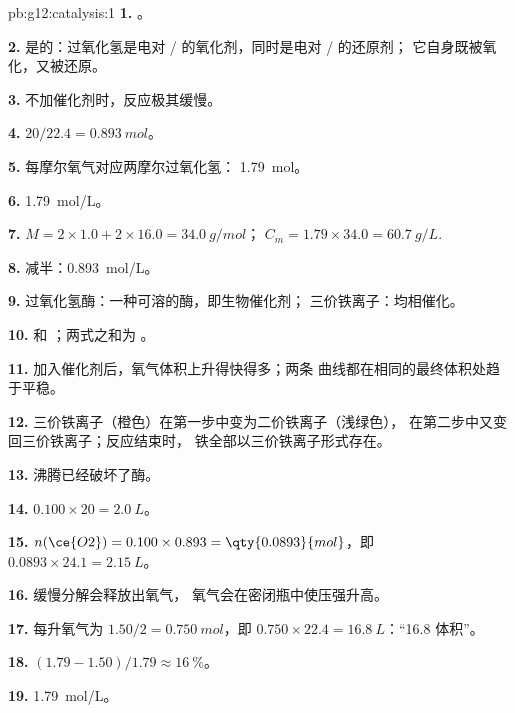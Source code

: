 \begin{solution}{pb:g12:catalysis:1}
\textbf{1.} 。

\textbf{2.} 是的：过氧化氢是电对
/ 的氧化剂，同时是电对 / 的还原剂；
它自身既被氧化，又被还原。

\textbf{3.} 不加催化剂时，反应极其缓慢。

\textbf{4.} $20 / 22.4 = \qty{0.893}{mol}$。

\textbf{5.} 每摩尔氧气对应两摩尔过氧化氢：
\qty{1.79}{mol}。

\textbf{6.} \qty{1.79}{mol/L}。

\textbf{7.} $M = 2 \times 1.0 + 2 \times 16.0 = \qty{34.0}{g/mol}$；
$C_m = 1.79 \times 34.0 = \qty{60.7}{g/L}$.

\textbf{8.} 减半：\qty{0.893}{mol/L}。

\textbf{9.} 过氧化氢酶：一种可溶的酶，即生物催化剂；
三价铁离子：均相催化。

\textbf{10.}  和
；两式之和为
。

\textbf{11.} 加入催化剂后，氧气体积上升得快得多；两条
曲线都在相同的最终体积处趋于平稳。

\textbf{12.} 三价铁离子（橙色）在第一步中变为二价铁离子（浅绿色），
在第二步中又变回三价铁离子；反应结束时，
铁全部以三价铁离子形式存在。

\textbf{13.} 沸腾已经破坏了酶。

\textbf{14.} $0.100 \times 20 = \qty{2.0}{L}$。

\textbf{15.} $n(\ce{O2}) = 0.100 \times 0.893 = \qty{0.0893}{mol}$，即
$0.0893 \times 24.1 = \qty{2.15}{L}$。

\textbf{16.} 缓慢分解会释放出氧气，
氧气会在密闭瓶中使压强升高。

\textbf{17.} 每升氧气为 $1.50 / 2 = \qty{0.750}{mol}$，即
$0.750 \times 22.4 = \qty{16.8}{L}$：“16.8 体积”。

\textbf{18.} $(1.79 - 1.50)/1.79 \approx \qty{16}{\percent}$。

\textbf{19.} \qty{1.79}{mol/L}。
\end{solution}
